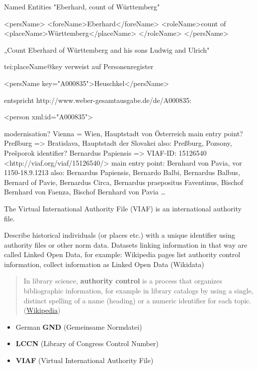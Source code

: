 \begin{frame}{Named Entities}
"Eberhard, count of Württemberg"
\begin{xmlcode}
<persName>
  <foreName>Eberhard</foreName>
  <roleName>count of
    <placeName>Württemberg</placeName>
  </roleName>
</persName>
\end{xmlcode}
„Count Eberhard of Württemberg and his sons Ludwig and Ulrich"


tei:placeName@key verweist auf Personenregister
\begin{xmlcode}
<persName key="A000835">Heuschkel</persName>
\end{xmlcode}
entspricht
http://www.weber-gesamtausgabe.de/de/A000835:
\begin{xmlcode}
<person xml:id="A000835">
\end{xmlcode}


modernisation?
Vienna = Wien, Hauptstadt von Österreich
main entry point?
Preßburg => Bratislava, Hauptstadt der Slovakei
also: Preßburg, Pozsony, Prešporok
identifier?
Bernardus Papiensis => VIAF-ID: 15126540 <http://viaf.org/viaf/15126540/>
main entry point: Bernhard von Pavia, vor 1150-18.9.1213
also: Bernardus Papiensis, Bernardo Balbi, Bernardus Balbus, Bernard of Pavie, Bernardus Circa, Bernardus praepositus Faventinus, Bischof Bernhard von Faenza, Bischof Bernhard von Pavia \dots



The Virtual International Authority File (VIAF) is an international authority file.

Describe historical individuals (or places etc.) with a unique identifier using authority files or other norm data. 
Datasets linking information in that way are called Linked Open Data, for example: Wikipedia pages list authority control information, collect information as Linked Open Data (Wikidata)

\begin{quote}
    In library science, \textbf{authority control} is a process that organizes bibliographic information, for example in library catalogs by using a single, distinct spelling of a name (heading) or a numeric identifier for each topic. (\href{https://en.wikipedia.org/wiki/Authority_control}{Wikipedia})
\end{quote}

\begin{itemize}
    \item German \textbf{GND} (Gemeinsame Normdatei)
    \item \textbf{LCCN} (Library of Congress Control Number)
    \item \textbf{VIAF} (Virtual International Authority File)
\end{itemize}


\end{frame}
